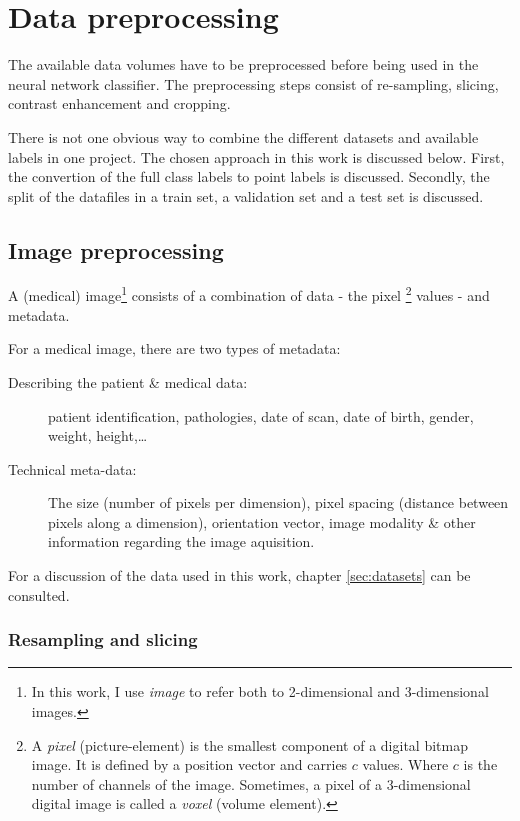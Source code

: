 \chapter{Data preprocessing}

The available data volumes have to be preprocessed before being used in the neural network classifier.
The preprocessing steps consist of re-sampling, slicing, contrast enhancement and cropping.  

There is not one obvious way to combine the different datasets and available labels in one project.
The chosen approach in this work is discussed below.
First, the convertion of the full class labels to point labels is discussed. 
Secondly, the split of the datafiles in a train set, a validation set and a test set is discussed.

\section{Image preprocessing}

A (medical) image\footnote{In this work, I use \textit{image} to refer both to 2-dimensional and 3-dimensional images.} consists of a combination of data - the pixel
\footnote{A \textit{pixel} (picture-element) is the smallest component of a digital bitmap image. 
It is defined by a position vector and carries $c$ values. Where $c$ is the number of channels of the image. 
Sometimes, a pixel of a 3-dimensional digital image is called a \textit{voxel} (volume element).} 
values - and metadata.

For a medical image, there are two types of metadata:
\begin{description}
    \item [Describing the patient \& medical data:] patient identification, pathologies, date of scan, date of birth, gender, weight, height,\dots
    \item [Technical meta-data:] The size (number of pixels per dimension), pixel spacing (distance between pixels along a dimension), orientation vector, image modality \& other information regarding the image aquisition.
\end{description}

For a discussion of the data used in this work, chapter \ref{sec:datasets} can be consulted. 

\subsection{Resampling and slicing\label{sec:resampling}}

